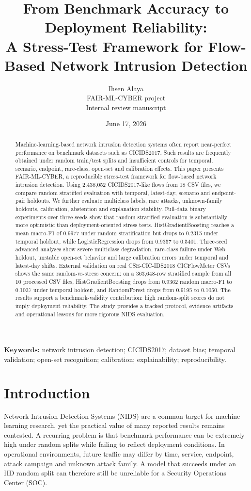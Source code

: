 \documentclass[11pt,a4paper]{article}
\title{\textbf{From Benchmark Accuracy to Deployment Reliability:}\\
A Stress-Test Framework for Flow-Based Network Intrusion Detection}
\author{
Ihsen Alaya\\
\small FAIR-ML-CYBER project\\
\small Internal review manuscript
}
\date{June 17, 2026}
\begin{document}
\maketitle

\begin{abstract}
Machine-learning-based network intrusion detection systems often report near-perfect performance on benchmark datasets such as CICIDS2017. Such results are frequently obtained under random train/test splits and insufficient controls for temporal, scenario, endpoint, rare-class, open-set and calibration effects. This paper presents FAIR-ML-CYBER, a reproducible stress-test framework for flow-based network intrusion detection. Using 2,438,052 CICIDS2017-like flows from 18 CSV files, we compare random stratified evaluation with temporal, latest-day, scenario and endpoint-pair holdouts. We further evaluate multiclass labels, rare attacks, unknown-family holdouts, calibration, abstention and explanation stability. Full-data binary experiments over three seeds show that random stratified evaluation is substantially more optimistic than deployment-oriented stress tests. HistGradientBoosting reaches a mean macro-F1 of 0.9977 under random stratification but drops to 0.2315 under temporal holdout, while LogisticRegression drops from 0.9357 to 0.5401. Three-seed advanced analyses show severe multiclass degradation, rare-class failure under Web holdout, unstable open-set behavior and large calibration errors under temporal and latest-day shifts. External validation on real CSE-CIC-IDS2018 CICFlowMeter CSVs shows the same random-vs-stress concern: on a 363,648-row stratified sample from all 10 processed CSV files, HistGradientBoosting drops from 0.9362 random macro-F1 to 0.1037 under temporal holdout, and RandomForest drops from 0.9195 to 0.1050. The results support a benchmark-validity contribution: high random-split scores do not imply deployment reliability. The study provides a tracked protocol, evidence artifacts and operational lessons for more rigorous NIDS evaluation.
\end{abstract}

\textbf{Keywords:} network intrusion detection; CICIDS2017; dataset bias; temporal validation; open-set recognition; calibration; explainability; reproducibility.

\section{Introduction}

Network Intrusion Detection Systems (NIDS) are a common target for machine learning research, yet the practical value of many reported results remains contested. A recurring problem is that benchmark performance can be extremely high under random splits while failing to reflect deployment conditions. In operational environments, future traffic may differ by time, service, endpoint, attack campaign and unknown attack family. A model that succeeds under an IID random split can therefore still be unreliable for a Security Operations Center (SOC).
\end{document}
